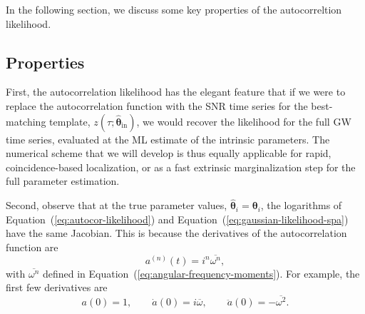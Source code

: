 \documentclass[amsmath,amssymb,aps,prx,reprint,nopreprintnumbers,nofootinbib]{revtex4-1}
\begin{document}
In the following section, we discuss some key properties of the autocorreltion likelihood.

\subsection{Properties}

First, the autocorrelation likelihood has the elegant feature that if we were to replace the autocorrelation function with the \ac{SNR} time series for the best-matching template, $z(\tau; \hat{\mathbf{\theta}}_\mathrm{in})$, we would recover the likelihood for the full \ac{GW} time series, evaluated at the \ac{ML} estimate of the intrinsic parameters. The numerical scheme that we will develop is thus equally applicable for rapid, coincidence-based localization, or as a fast extrinsic marginalization step for the full parameter estimation.

Second, observe that at the true parameter values, $\hat{\bm\theta}_i = \bm\theta_i$, the logarithms of Equation~(\ref{eq:autocor-likelihood}) and Equation~(\ref{eq:gaussian-likelihood-spa}) have the same Jacobian. This is because the derivatives of the autocorrelation function are
%
\begin{equation*}
    a^{(n)}(t) = i^n \overline{\omega^n},
\end{equation*}
%
with $\overline{\omega^n}$ defined in Equation~(\ref{eq:angular-frequency-moments}). For example, the first few derivatives are
%
\begin{equation*}
    a(0) = 1,
    \qquad
    \dot{a}(0) = i \overline{\omega},
    \qquad
    \ddot{a}(0) = -\overline{\omega^2}.
\end{equation*}
\end{document}

